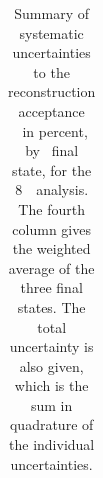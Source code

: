 \begin{table}[htbp]
\begin{tabular}{l c c c c}

   \end{tabular}
   \caption[Systematic uncertainties to the reconstruction acceptance \CZZ\ for
   the 8~\tev\ analysis.]
   {Summary of systematic uncertainties to the reconstruction acceptance \CZZ\
   in percent, by \ZZ\ final state, for the 8~\tev\ analysis. 
   The fourth column gives the weighted average
   of the three final states. The total uncertainty is also given, which is the
   sum in quadrature of the individual uncertainties.} 
   \label{table:objSel-syst-eight}
\end{table}
